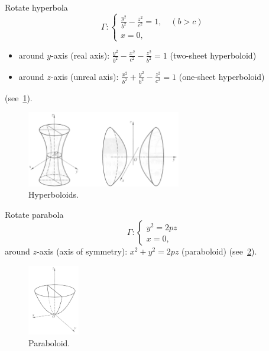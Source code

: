 \documentclass[11pt]{../../TexTemplate/elegantbook} %
\begin{document}
\noindent Rotate hyperbola
\[
\Gamma: \begin{cases} \frac{y^{2}}{b^{2}}-\frac{z^{2}}{c^{2}} = 1,\quad (b>c) \\ x = 0, \end{cases}
\]
\begin{itemize}
    \item around \(y\)-axis (real axis): \( \frac{y^{2}}{b^{2}} - \frac{x^{2}}{c^{2}} - \frac{z^{2}}{b^{2}} = 1\) 
        (two-sheet hyperboloid) 
    \item around \(z\)-axis (unreal axis): \( \frac{x^{2}}{b^{2}} + \frac{y^{2}}{b^{2}} - \frac{z^{2}}{c^{2}} = 1\) 
        (one-sheet hyperboloid)
\end{itemize}
(see~\ref{fig:Hyperboloids}).
\begin{figure}[h]
    \centering
    \includegraphics[width=0.6\textwidth]{img/hyperbola.png}
    \caption{Hyperboloids.}
    \label{fig:Hyperboloids}
\end{figure}

\noindent Rotate parabola
\[
\Gamma: \begin{cases} y^{2} = 2pz \\ x = 0, \end{cases}
\]
around \(z\)-axis (axis of symmetry): \(x^{2} + y^{2} = 2pz\) (paraboloid)
(see~\ref{fig:paraboloid}).
\begin{figure}[h]
    \centering
    \includegraphics[width=0.2\textwidth]{img/parabola.png}
    \caption{Paraboloid.}
    \label{fig:paraboloid}
\end{figure}
\end{document}
